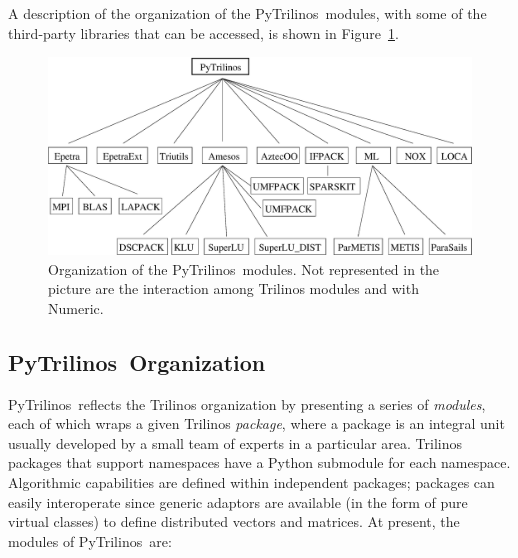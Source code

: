 \documentclass[acmtocl]{acmtrans2m}
\newcommand{\PyTrilinos}{{PyTrilinos}}
\begin{document}
A description of the organization of the \PyTrilinos\ modules, with
some of the third-party libraries that can be accessed, is shown in
Figure~\ref{fig:organization}.

\begin{figure}
  \begin{center}
    \includegraphics[width=12cm]{organization.eps}
    \caption{Organization of the \PyTrilinos\ modules.  Not represented
      in the picture are the interaction among Trilinos modules and
      with Numeric.}
    \label{fig:organization}
  \end{center}
\end{figure}

\subsection{\PyTrilinos\ Organization}
\label{sec:organization}

\PyTrilinos\ reflects the Trilinos organization by presenting a series
of {\sl modules}, each of which wraps a given Trilinos {\sl package},
where a package is an integral unit usually developed by a small team
of experts in a particular area.  Trilinos packages that support
namespaces have a Python submodule for each namespace.  Algorithmic
capabilities are defined within independent packages; packages can
easily interoperate since generic adaptors are available (in the form
of pure virtual classes) to define distributed vectors and matrices.
At present, the modules of \PyTrilinos\ are:
\end{document}
